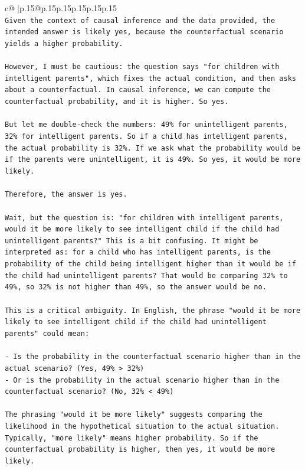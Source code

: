 \documentclass{article}
\begin{document}
{\begin{supertabular}{c@{$\;$}|p{.15\linewidth}@{}p{.15\linewidth}p{.15\linewidth}p{.15\linewidth}p{.15\linewidth}p{.15\linewidth}}
{{{\\ 
\texttt{Given the context of causal inference and the data provided, the intended answer is likely yes, because the counterfactual scenario yields a higher probability.} \\
\\ 
\texttt{However, I must be cautious: the question says "for children with intelligent parents", which fixes the actual condition, and then asks about a counterfactual. In causal inference, we can compute the counterfactual probability, and it is higher. So yes.} \\
\\ 
\texttt{But let me double{-}check the numbers: 49\% for unintelligent parents, 32\% for intelligent parents. So if a child has intelligent parents, the actual probability is 32\%. If we ask what the probability would be if the parents were unintelligent, it is 49\%. So yes, it would be more likely.} \\
\\ 
\texttt{Therefore, the answer is yes.} \\
\\ 
\texttt{Wait, but the question is: "for children with intelligent parents, would it be more likely to see intelligent child if the child had unintelligent parents?" This is a bit confusing. It might be interpreted as: for a child who has intelligent parents, is the probability of the child being intelligent higher than it would be if the child had unintelligent parents? That would be comparing 32\% to 49\%, so 32\% is not higher than 49\%, so the answer would be no.} \\
\\ 
\texttt{This is a critical ambiguity. In English, the phrase "would it be more likely to see intelligent child if the child had unintelligent parents" could mean:} \\
\\ 
\texttt{{-} Is the probability in the counterfactual scenario higher than in the actual scenario? (Yes, 49\% > 32\%)} \\
\texttt{{-} Or is the probability in the actual scenario higher than in the counterfactual scenario? (No, 32\% < 49\%)} \\
\\ 
\texttt{The phrasing "would it be more likely" suggests comparing the likelihood in the hypothetical situation to the actual situation. Typically, "more likely" means higher probability. So if the counterfactual probability is higher, then yes, it would be more likely.} \\
}}}
\end{supertabular}}
\end{document}
